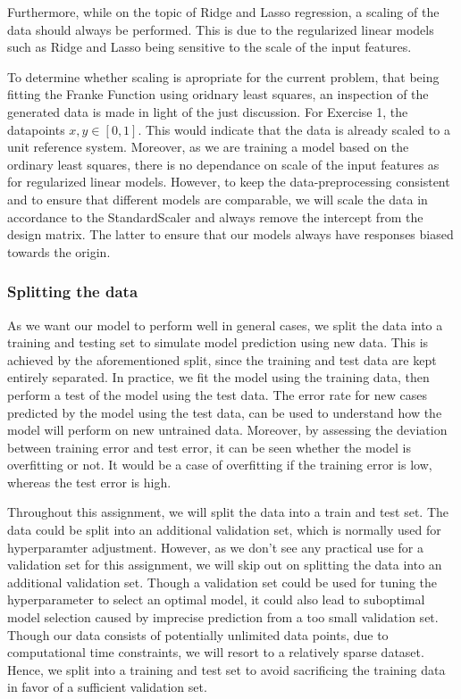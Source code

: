 \documentclass[11pt, a4paper]{article}
\begin{document}
Furthermore, while on the topic of Ridge and Lasso regression, a scaling of the data should always be performed. This is due to the regularized linear models such as Ridge and Lasso being sensitive to the scale of the input features. \cite{Geron2019}

To determine whether scaling is apropriate for the current problem, that being fitting the Franke Function using oridnary least squares, an inspection of the generated data is made in light of the just discussion. For Exercise 1, the datapoints $x,y \in \left[0,1\right]$. This would indicate that the data is already scaled to a unit reference system. Moreover, as we are training a model based on the ordinary least squares, there is no dependance on scale of the input features as for regularized linear models. However, to keep the data-preprocessing consistent and to ensure that different models are comparable, we will scale the data in accordance to the StandardScaler and always remove the intercept from the design matrix. The latter to ensure that our models always have responses biased towards the origin.

\subsubsection*{Splitting the data}
As we want our model to perform well in general cases, we split the data into a training and testing set to simulate model prediction using new data. This is achieved by the aforementioned split, since the training and test data are kept entirely separated. In practice, we fit the model using the training data, then perform a test of the model using the test data. The error rate for new cases predicted by the model using the test data, can be used to understand how the model will perform on new untrained data. \cite{Geron2019} Moreover, by assessing the deviation between training error and test error, it can be seen whether the model is overfitting or not. It would be a case of overfitting if the training error is low, whereas the test error is high.

Throughout this assignment, we will split the data into a train and test set. The data could be split into an additional validation set, which is normally used for hyperparamter adjustment. However, as we don't see any practical use for a validation set for this assignment, we will skip out on splitting the data into an additional validation set. Though a validation set could be used for tuning the hyperparameter to select an optimal model, it could also lead to suboptimal model selection caused by imprecise prediction from a too small validation set. \cite{Geron2019} Though our data consists of potentially unlimited data points, due to computational time constraints, we will resort to a relatively sparse dataset. Hence, we split into a training and test set to avoid sacrificing the training data in favor of a sufficient validation set.
\end{document}
